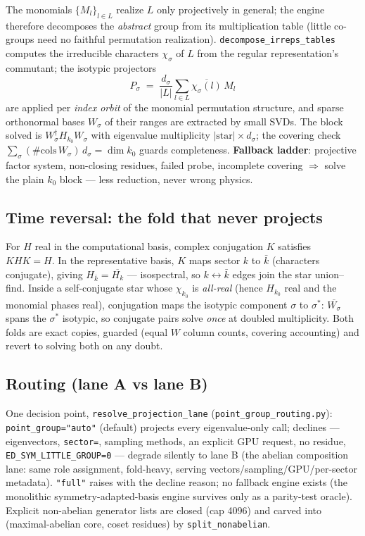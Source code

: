 \documentclass[11pt]{article}
\newcommand{\file}[1]{\texttt{\small #1}}
\begin{document}
The monomials $\{M_l\}_{l \in L}$ realize $L$ only projectively in general;
the engine therefore decomposes the \emph{abstract} group from its
multiplication table (little co-groups need no faithful permutation
realization). \texttt{decompose\_irreps\_tables} computes the irreducible
characters $\chi_\sigma$ of $L$ from the regular representation's commutant;
the isotypic projectors
\begin{equation}
  P_\sigma \;=\; \frac{d_\sigma}{|L|} \sum_{l \in L}
  \overline{\chi_\sigma(l)}\, M_l
  \label{eq:isotypic}
\end{equation}
are applied per \emph{index orbit} of the monomial permutation structure,
and sparse orthonormal bases $W_\sigma$ of their ranges are extracted by
small SVDs. The block solved is $W_\sigma^\dagger H_{k_0} W_\sigma$ with
eigenvalue multiplicity $|\text{star}| \times d_\sigma$; the covering check
$\sum_\sigma (\#\mathrm{cols}\, W_\sigma) \, d_\sigma = \dim k_0$ guards
completeness. \textbf{Fallback ladder}: projective factor system,
non-closing residues, failed probe, incomplete covering $\Rightarrow$ solve
the plain $k_0$ block --- less reduction, never wrong physics.

\subsection{Time reversal: the fold that never projects}
\label{sec:tr}

For $H$ real in the computational basis, complex conjugation $K$ satisfies
$K H K = H$. In the representative basis, $K$ maps sector $k$ to $\bar k$
(characters conjugate), giving $H_{\bar k} = \overline{H_k}$ ---
isospectral, so $k \leftrightarrow \bar k$ edges join the star union--find.
Inside a self-conjugate star whose $\chi_{k_0}$ is \emph{all-real} (hence
$H_{k_0}$ real and the monomial phases real), conjugation maps the isotypic
component $\sigma$ to $\sigma^*$: $\overline{W_\sigma}$ spans the
$\sigma^*$ isotypic, so conjugate pairs solve \emph{once} at doubled
multiplicity. Both folds are exact copies, guarded (equal $W$ column
counts, covering accounting) and revert to solving both on any doubt.

\subsection{Routing (lane A vs lane B)}

One decision point, \texttt{resolve\_projection\_lane}
(\file{point\_group\_routing.py}): \texttt{point\_group="auto"} (default)
projects every eigenvalue-only call; declines --- eigenvectors,
\texttt{sector=}, sampling methods, an explicit GPU request, no residue,
\texttt{ED\_SYM\_LITTLE\_GROUP=0} --- degrade silently to lane B
(the abelian composition lane: same role assignment, fold-heavy, serving
vectors/sampling/GPU/per-sector metadata). \texttt{"full"} raises with the
decline reason; no fallback engine exists (the monolithic
symmetry-adapted-basis engine survives only as a parity-test oracle).
Explicit non-abelian generator lists are closed (cap 4096) and carved into
(maximal-abelian core, coset residues) by \texttt{split\_nonabelian}.
\end{document}
